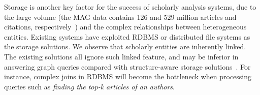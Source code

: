 Storage is another key factor for the success of scholarly analysis systems, due to the large volume (\eg the MAG data contains 126 and 529 million articles and citations, respectively~\cite{sinha2015overview}) and the complex relationships between heterogeneous entities.
Existing systems have exploited RDBMS or distributed file systems as the storage solutions.
%
We observe that scholarly entities are inherently linked. The existing solutions all ignore such linked feature, and may be inferior in answering graph queries compared with structure-aware storage solutions~\cite{BigGraphSearch}. For instance, complex joins in RDBMS will become the bottleneck when processing queries such as {\em finding the top-k articles of an authors}.



